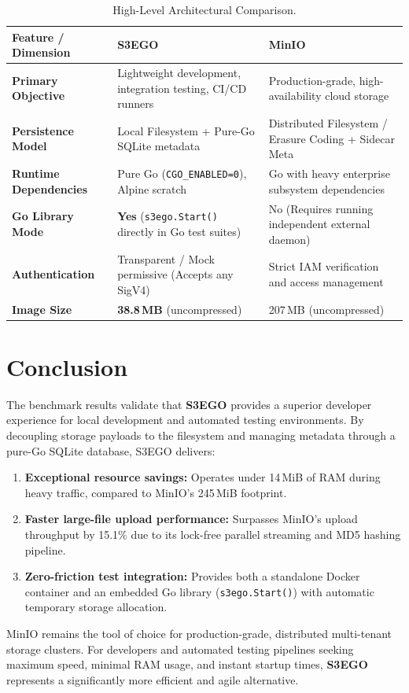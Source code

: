 \documentclass[11pt,a4paper]{article}
\begin{document}
\begin{table}[h!]
\centering
\small
\begin{tabularx}{\textwidth}{l p{6.5cm} p{6.5cm}}
\toprule
\textbf{Feature / Dimension} & \textbf{S3EGO} & \textbf{MinIO} \\
\midrule
\textbf{Primary Objective} & Lightweight development, integration testing, CI/CD runners & Production-grade, high-availability cloud storage \\
\textbf{Persistence Model} & Local Filesystem + Pure-Go SQLite metadata & Distributed Filesystem / Erasure Coding + Sidecar Meta \\
\textbf{Runtime Dependencies} & Pure Go (\texttt{CGO\_ENABLED=0}), Alpine scratch & Go with heavy enterprise subsystem dependencies \\
\textbf{Go Library Mode} & \textbf{Yes} (\texttt{s3ego.Start()} directly in Go test suites) & No (Requires running independent external daemon) \\
\textbf{Authentication} & Transparent / Mock permissive (Accepts any SigV4) & Strict IAM verification and access management \\
\textbf{Image Size} & \textbf{38.8\,MB} (uncompressed) & 207\,MB (uncompressed) \\
\bottomrule
\end{tabularx}
\caption{High-Level Architectural Comparison.}
\label{tab:arch_comparison}
\end{table}

\section{Conclusion}

The benchmark results validate that \textbf{S3EGO} provides a superior developer experience for local development and automated testing environments. By decoupling storage payloads to the filesystem and managing metadata through a pure-Go SQLite database, S3EGO delivers:
\begin{enumerate}
    \item \textbf{Exceptional resource savings:} Operates under 14\,MiB of RAM during heavy traffic, compared to MinIO's 245\,MiB footprint.
    \item \textbf{Faster large-file upload performance:} Surpasses MinIO's upload throughput by 15.1\% due to its lock-free parallel streaming and MD5 hashing pipeline.
    \item \textbf{Zero-friction test integration:} Provides both a standalone Docker container and an embedded Go library (\texttt{s3ego.Start()}) with automatic temporary storage allocation.
\end{enumerate}

MinIO remains the tool of choice for production-grade, distributed multi-tenant storage clusters. For developers and automated testing pipelines seeking maximum speed, minimal RAM usage, and instant startup times, \textbf{S3EGO} represents a significantly more efficient and agile alternative.
\end{document}
